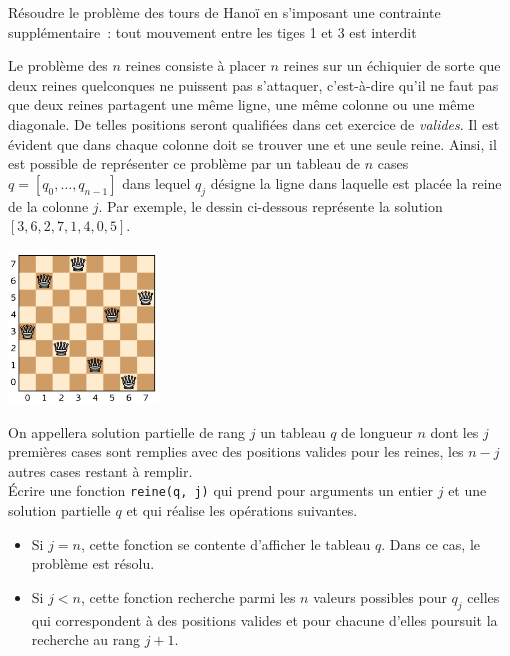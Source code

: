 \documentclass{magnolia}
\begin{document}
Résoudre le problème des tours de Hanoï en s’imposant une contrainte supplémentaire~: tout mouvement entre les tiges 1 et 3 est interdit 

Le problème des $n$ reines consiste à placer $n$ reines sur un échiquier de sorte que
deux reines quelconques ne puissent pas s'attaquer, c'est-à-dire qu'il ne faut pas que
deux reines partagent une même ligne, une même colonne ou une même diagonale. De telles
positions seront qualifiées dans cet exercice de \emph{valides}. Il est évident que
dans chaque colonne doit se trouver une et une seule reine. Ainsi, il est possible de
représenter ce problème par un tableau de $n$ cases $q=[q_0,\ldots,q_{n-1}]$ dans lequel
$q_j$ désigne la ligne dans laquelle est placée la reine de la colonne $j$. Par exemple,
le dessin ci-dessous représente la solution $[3, 6, 2, 7, 1, 4, 0, 5]$.
\begin{center}
\includegraphics[width=0.3\textwidth]{../../Commun/Images/python-exos-rec-8.pdf}
\end{center}
On appellera solution partielle de rang $j$ un tableau $q$ de longueur $n$ dont les $j$
premières cases sont remplies avec des positions valides pour les reines, les
$n-j$ autres cases restant à remplir.\\

Écrire une fonction \verb!reine(q, j)! qui prend pour arguments un entier $j$ et une solution
partielle $q$ et qui réalise les opérations suivantes.
\begin{itemize}
\item Si $j=n$, cette fonction se contente d'afficher le tableau $q$. Dans ce cas, le problème
  est résolu.
\item Si $j<n$, cette fonction recherche parmi les $n$ valeurs possibles pour $q_j$ celles qui
  correspondent à des positions valides et pour chacune d'elles poursuit la recherche au
	rang $j+1$.
\end{itemize}
\end{document}

